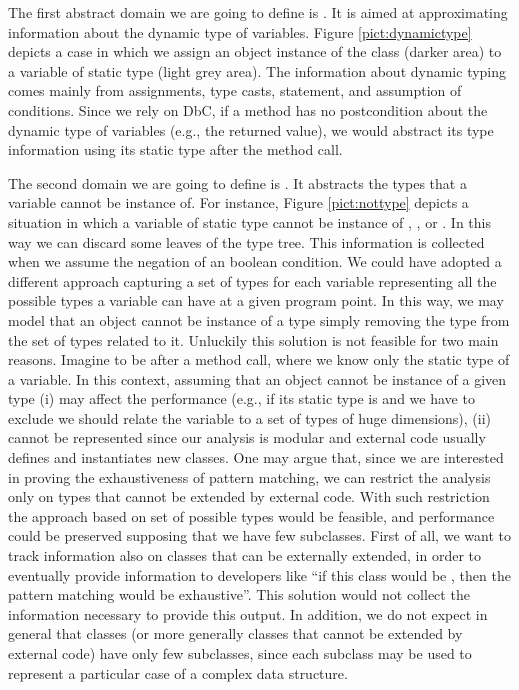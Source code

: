 \documentclass{llncs}
\begin{document}
The first abstract domain we are going to define is \dynamictype. It is aimed at approximating information about the dynamic type of variables. Figure \ref{pict:dynamictype} depicts a case in which we assign an object instance of the  class (darker area) to a variable of static type  (light grey area). The information about dynamic typing comes mainly from assignments, type casts,  statement, and assumption of  conditions. Since we rely on DbC, if a method has no postcondition about the dynamic type of variables (e.g., the returned value), we would abstract its type information using its static type after the method call.

The second domain we are going to define is \nottype. It abstracts the types that a variable cannot be instance of. For instance, Figure \ref{pict:nottype} depicts a situation in which a variable of static type  cannot be instance of , , or . In this way we can discard some leaves of the type tree. This information is collected when we assume the negation of an  boolean condition. We could have adopted a different approach capturing a set of types for each variable representing all the possible types a variable can have at a given program point. In this way, we may model that an object cannot be instance of a type simply removing the type from the set of types related to it. Unluckily this solution is not feasible for two main reasons. Imagine to be after a method call, where we know only the static type of a variable. In this context, assuming that an object cannot be instance of a given type (i) may affect the performance (e.g., if its static type is  and we have to exclude  we should relate the variable to a set of types of huge dimensions), (ii) cannot be represented since our analysis is modular and external code usually defines and instantiates new classes. One may argue that, since we are interested in proving the exhaustiveness of pattern matching, we can restrict the analysis only on types that cannot be extended by external code. With such restriction the approach based on set of possible types would be feasible, and performance could be preserved supposing that we have few subclasses. First of all, we want to track information also on classes that can be externally extended, in order to eventually provide information to developers like \textquotedblleft if this class would be , then the pattern matching would be exhaustive\textquotedblright. This solution would not collect the information necessary to provide this output. In addition, we do not expect in general that  classes (or more generally classes that cannot be extended by external code) have only few subclasses, since each subclass may be used to represent a particular case of a complex data structure.
\end{document}
